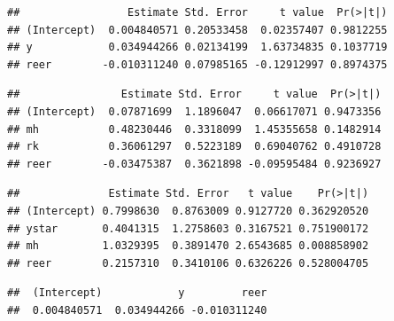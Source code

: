 \documentclass[]{article}
\newenvironment{Shaded}{\begin{snugshade}}{\end{snugshade}}
\newcommand{\DecValTok}[1]{\textcolor[rgb]{0.00,0.00,0.81}{#1}}
\newcommand{\OperatorTok}[1]{\textcolor[rgb]{0.81,0.36,0.00}{\textbf{#1}}}
\newcommand{\NormalTok}[1]{#1}
\begin{document}
\begin{verbatim}
##                 Estimate Std. Error     t value  Pr(>|t|)
## (Intercept)  0.004840571 0.20533458  0.02357407 0.9812255
## y            0.034944266 0.02134199  1.63734835 0.1037719
## reer        -0.010311240 0.07985165 -0.12912997 0.8974375
\end{verbatim}

\begin{Shaded}
\end{Shaded}

\begin{verbatim}
##                Estimate Std. Error     t value  Pr(>|t|)
## (Intercept)  0.07871699  1.1896047  0.06617071 0.9473356
## mh           0.48230446  0.3318099  1.45355658 0.1482914
## rk           0.36061297  0.5223189  0.69040762 0.4910728
## reer        -0.03475387  0.3621898 -0.09595484 0.9236927
\end{verbatim}

\begin{Shaded}
\end{Shaded}

\begin{verbatim}
##              Estimate Std. Error   t value    Pr(>|t|)
## (Intercept) 0.7998630  0.8763009 0.9127720 0.362920520
## ystar       0.4041315  1.2758603 0.3167521 0.751900172
## mh          1.0329395  0.3891470 2.6543685 0.008858902
## reer        0.2157310  0.3410106 0.6326226 0.528004705
\end{verbatim}

\begin{Shaded}
\end{Shaded}

\begin{verbatim}
##  (Intercept)            y         reer 
##  0.004840571  0.034944266 -0.010311240
\end{verbatim}

\begin{Shaded}
\end{Shaded}
\end{document}
